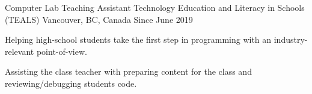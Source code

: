 

\begin{cventries}


  \cventry
    {Computer Lab Teaching Assistant} %
    {Technology Education and Literacy in Schools (TEALS)} %
    {Vancouver, BC, Canada} %
    {Since June 2019} %
    {
      \begin{cvitems} %
        \item {Helping high-school students take the first step in programming with an industry-relevant point-of-view.}
        \item {Assisting the class teacher with preparing content for the class and reviewing/debugging students code.}
        \\
      \end{cvitems}
    }
    \vspace{2.0mm}


\end{cventries}

